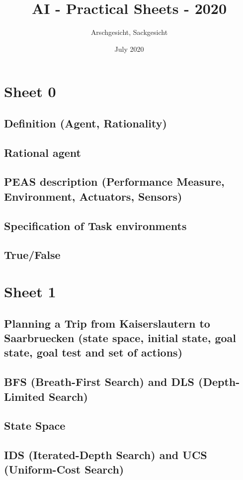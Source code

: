 \documentclass{article}
\title{AI - Practical Sheets - 2020}
\author{Arschgesicht, Sackgesicht}
\date{July 2020}
\begin{document}
\maketitle

\tableofcontents
\newpage


\section{Sheet 0}
    \subsection{Definition (Agent, Rationality)}
    \subsection{Rational agent}
    \subsection{PEAS description (Performance Measure, Environment, Actuators, Sensors)}
    \subsection{Specification of Task environments}
    \subsection{True/False}
    

\section{Sheet 1}
    \subsection{Planning a Trip from Kaiserslautern to Saarbruecken (state space, initial state, goal state, goal test and set of actions)}
    \subsection{BFS (Breath-First Search) and DLS (Depth-Limited Search)}
    \subsection{State Space}
    \subsection{IDS (Iterated-Depth Search) and UCS (Uniform-Cost Search)}
    
    
\end{document}
